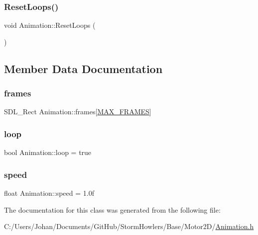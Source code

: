 \subsubsection{\texorpdfstring{ResetLoops()}{ResetLoops()}}
{\footnotesize\ttfamily void Animation\+::\+Reset\+Loops (\begin{DoxyParamCaption}{ }\end{DoxyParamCaption})\hspace{0.3cm}{\ttfamily [inline]}}



\subsection{Member Data Documentation}
\mbox{\label{class_animation_af42671d4f015c2a11bf4af178ed357e0}} 
\subsubsection{\texorpdfstring{frames}{frames}}
{\footnotesize\ttfamily S\+D\+L\+\_\+\+Rect Animation\+::frames\mbox{[}\mbox{\hyperlink{_animation_8h_a5b4055201d2d8170e179b1ceaa438b9c}{M\+A\+X\+\_\+\+F\+R\+A\+M\+ES}}\mbox{]}}

\mbox{\label{class_animation_a951ff207e048c16b7c5dde293eb5419b}} 
\subsubsection{\texorpdfstring{loop}{loop}}
{\footnotesize\ttfamily bool Animation\+::loop = true}

\mbox{\label{class_animation_a68079384a94a0ebdba03241f1937608e}} 
\subsubsection{\texorpdfstring{speed}{speed}}
{\footnotesize\ttfamily float Animation\+::speed = 1.\+0f}



The documentation for this class was generated from the following file\+:\begin{DoxyCompactItemize}
\item 
C\+:/\+Users/\+Johan/\+Documents/\+Git\+Hub/\+Storm\+Howlers/\+Base/\+Motor2\+D/\mbox{\hyperlink{_animation_8h}{Animation.\+h}}\end{DoxyCompactItemize}
